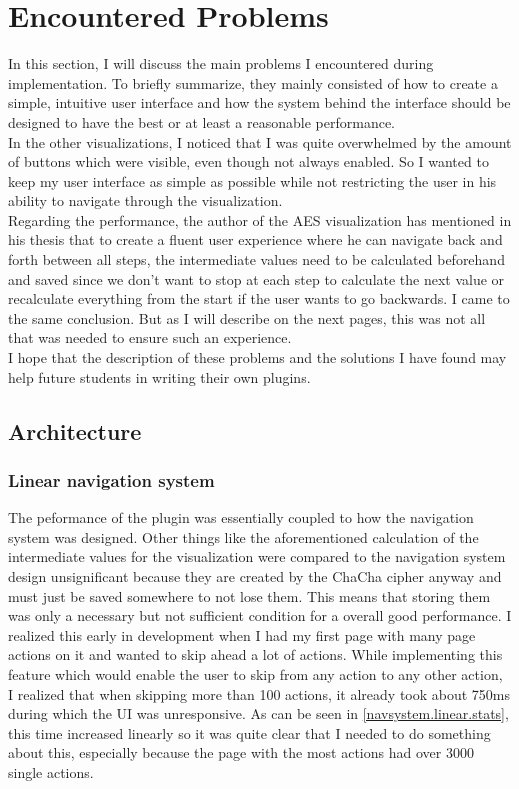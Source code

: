 
\section{Encountered Problems}
\label{sec:encounteredProblems}

In this section, I will discuss the main problems I encountered during implementation. To briefly summarize, they mainly consisted of how to create a simple, intuitive user interface and how the system behind the interface should be designed to have the best or at least a reasonable performance. \\ In the other visualizations, I noticed that I was quite overwhelmed by the amount of buttons which were visible, even though not always enabled. So I wanted to keep my user interface as simple as possible while not restricting the user in his ability to navigate through the visualization. \\ Regarding the performance, the author of the AES visualization has mentioned in his thesis that to create a fluent user experience where he can navigate back and forth between all steps, the intermediate values need to be calculated beforehand and saved since we don't want to stop at each step to calculate the next value or recalculate everything from the start if the user wants to go backwards. I came to the same conclusion. But as I will describe on the next pages, this was not all that was needed to ensure such an experience.\\
I hope that the description of these problems and the solutions I have found may help future students in writing their own plugins.

\subsection{Architecture}

\subsubsection{Linear navigation system}

The peformance of the plugin was essentially coupled to how the navigation system was designed. Other things like the aforementioned calculation of the intermediate values for the visualization were compared to the navigation system design unsignificant because they are created by the ChaCha cipher anyway and must just be saved somewhere to not lose them. This means that storing them was only a necessary but not sufficient condition for a overall good performance. I realized this early in development when I had my first page with many page actions on it and wanted to skip ahead a lot of actions. While implementing this feature which would enable the user to skip from any action to any other action, I realized that when skipping more than 100 actions, it already took about 750ms during which the UI was unresponsive. As can be seen in \ref{navsystem.linear.stats}, this time increased linearly so it was quite clear that I needed to do something about this, especially because the page with the most actions had over 3000 single actions.

